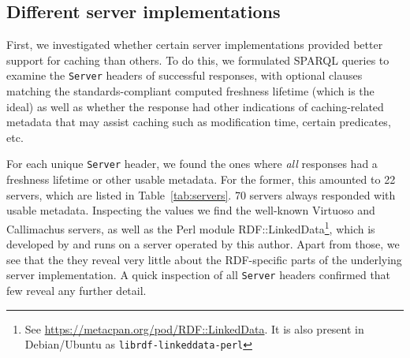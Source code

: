 \documentclass{llncs}
\newcommand{\httph}[1]{\texttt{#1}}
\begin{document}
\subsection{Different server implementations}

First, we investigated whether certain server implementations provided
better support for caching than others. To do this, we formulated
SPARQL queries to examine the \httph{Server} headers of successful
responses, with optional clauses matching the standards-compliant
computed freshness lifetime (which is the ideal) as well as whether
the response had other indications of caching-related metadata that
may assist caching such as modification time, certain predicates, etc.

For each unique \httph{Server} header, we found the ones where
\emph{all} responses had a freshness lifetime or other usable
metadata. For the former, this amounted to 22 servers, which are
listed in Table~\ref{tab:servers}.  70 servers always responded with
usable metadata. Inspecting the values we find the well-known Virtuoso
and Callimachus servers, as well as the Perl module
RDF::LinkedData\footnote{See
  \url{https://metacpan.org/pod/RDF::LinkedData}. It is also present
  in Debian/Ubuntu as \texttt{librdf-linkeddata-perl}}, which is
developed by and runs on a server operated by this author. Apart from
those, we see that the they reveal very little about the RDF-specific
parts of the underlying server implementation. A quick inspection of
all \httph{Server} headers confirmed that few reveal any further
detail.
\end{document}

